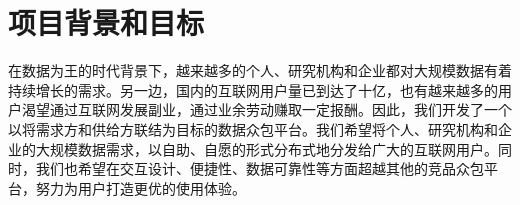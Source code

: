 \section{项目背景和目标}

在数据为王的时代背景下，越来越多的个人、研究机构和企业都对大规模数据有着持续增长的需求。另一边，国内的互联网用户量已到达了十亿，也有越来越多的用户渴望通过互联网发展副业，通过业余劳动赚取一定报酬。因此，我们开发了一个以将需求方和供给方联结为目标的数据众包平台。我们希望将个人、研究机构和企业的大规模数据需求，以自助、自愿的形式分布式地分发给广大的互联网用户。同时，我们也希望在交互设计、便捷性、数据可靠性等方面超越其他的竞品众包平台，努力为用户打造更优的使用体验。